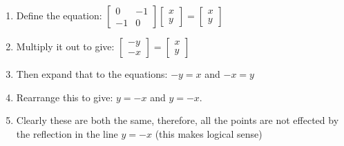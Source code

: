 \documentclass{article}[12pt]
\begin{document}
\begin{enumerate}
    \item Define the equation: $\begin{bmatrix} 0 & -1 \\ -1 & 0\end{bmatrix}\begin{bmatrix} x \\ y\end{bmatrix}=\begin{bmatrix} x \\ y\end{bmatrix}$
    \item Multiply it out to give: $\begin{bmatrix} -y \\ -x\end{bmatrix}=\begin{bmatrix} x \\ y\end{bmatrix}$
    \item Then expand that to the equations: $-y = x$ and $-x = y$
    \item Rearrange this to give: $y = -x$ and $y = -x$.
    \item Clearly these are both the same, therefore, all the points are not effected by the reflection in the line $y=-x$ (this makes logical sense)
\end{enumerate}
\end{document}
